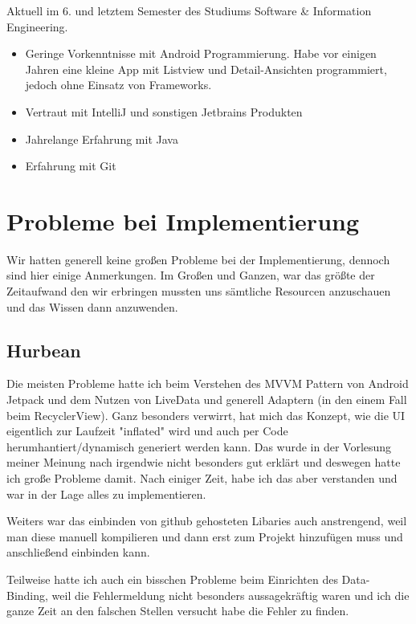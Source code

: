 \documentclass{mrtrash}
\begin{document}
Aktuell im 6. und letztem Semester des Studiums Software \& Information Engineering.

\begin{itemize}
    \item Geringe Vorkenntnisse mit Android Programmierung. Habe vor einigen Jahren eine kleine App mit Listview und Detail-Ansichten programmiert, jedoch ohne Einsatz von Frameworks.
    \item Vertraut mit IntelliJ und sonstigen Jetbrains Produkten
    \item Jahrelange Erfahrung mit Java
    \item Erfahrung mit Git
\end{itemize}

\begin{minipage}[t]{\textwidth}
    \centering
\end{minipage}

\section{Probleme bei Implementierung}

Wir hatten generell keine großen Probleme bei der Implementierung, dennoch sind hier einige Anmerkungen. Im Großen und Ganzen, war das größte der Zeitaufwand den wir erbringen mussten uns sämtliche Resourcen anzuschauen und das Wissen dann anzuwenden.

\subsection{Hurbean}

Die meisten Probleme hatte ich beim Verstehen des MVVM Pattern von Android Jetpack und dem Nutzen von LiveData und generell Adaptern (in den einem Fall beim RecyclerView). Ganz besonders verwirrt, hat mich das Konzept, wie die UI eigentlich zur Laufzeit "inflated" wird und auch per Code herumhantiert/dynamisch generiert werden kann. Das wurde in der Vorlesung meiner Meinung nach irgendwie nicht besonders gut erklärt und deswegen hatte ich große Probleme damit. Nach einiger Zeit, habe ich das aber verstanden und war in der Lage alles zu implementieren.

Weiters war das einbinden von github gehosteten Libaries auch anstrengend, weil man diese manuell kompilieren und dann erst zum Projekt hinzufügen muss und anschließend einbinden kann.

Teilweise hatte ich auch ein bisschen Probleme beim Einrichten des Data-Binding, weil die Fehlermeldung nicht besonders aussagekräftig waren und ich die ganze Zeit an den falschen Stellen versucht habe die Fehler zu finden.
\end{document}
